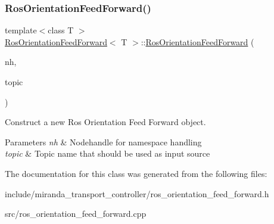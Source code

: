 \subsubsection{\texorpdfstring{Ros\+Orientation\+Feed\+Forward()}{RosOrientationFeedForward()}}
{\footnotesize\ttfamily template$<$class T $>$ \\
\hyperlink{classRosOrientationFeedForward}{Ros\+Orientation\+Feed\+Forward}$<$ T $>$\+::\hyperlink{classRosOrientationFeedForward}{Ros\+Orientation\+Feed\+Forward} (\begin{DoxyParamCaption}\item[{ros\+::\+Node\+Handle \&}]{nh,  }\item[{std\+::string}]{topic }\end{DoxyParamCaption})}



Construct a new Ros Orientation Feed Forward object. 


\begin{DoxyParams}{Parameters}
{\em nh} & Nodehandle for namespace handling \\
\hline
{\em topic} & Topic name that should be used as input source \\
\hline
\end{DoxyParams}


The documentation for this class was generated from the following files\+:\begin{DoxyCompactItemize}
\item 
include/miranda\+\_\+transport\+\_\+controller/ros\+\_\+orientation\+\_\+feed\+\_\+forward.\+h\item 
src/ros\+\_\+orientation\+\_\+feed\+\_\+forward.\+cpp\end{DoxyCompactItemize}
